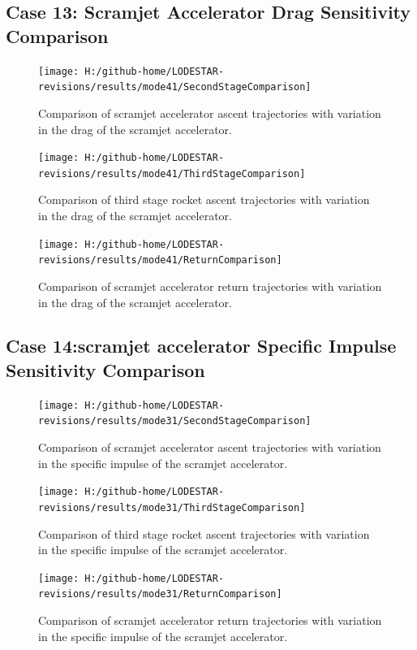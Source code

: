 \subsection{Case 13: Scramjet Accelerator Drag Sensitivity Comparison}\label{sec:app_comparison41}
\begin{figure}[!th]
\centering
\texttt{[image: H:/github-home/LODESTAR-revisions/results/mode41/SecondStageComparison]}
\caption{Comparison of scramjet accelerator ascent trajectories with variation in the drag of the scramjet accelerator.}
\label{fig:SecondStageComparison11}
\end{figure}
\begin{figure}[!th]
\centering
\texttt{[image: H:/github-home/LODESTAR-revisions/results/mode41/ThirdStageComparison]}
\caption{Comparison of third stage rocket ascent trajectories with variation in the drag of the scramjet accelerator.}
\label{fig:ThirdStageComparison11}
\end{figure}
\begin{figure}[!th]
\centering
\texttt{[image: H:/github-home/LODESTAR-revisions/results/mode41/ReturnComparison]}
\caption{Comparison of scramjet accelerator return trajectories with variation in the drag of the scramjet accelerator.}
\label{fig:ReturnComparison11}
\end{figure}
\FloatBarrier
\clearpage
\subsection{Case 14:scramjet accelerator Specific Impulse Sensitivity Comparison}\label{sec:app_comparison31}
\begin{figure}[!th]
	\centering
	\texttt{[image: H:/github-home/LODESTAR-revisions/results/mode31/SecondStageComparison]}
	\caption{Comparison of scramjet accelerator ascent trajectories with variation in the specific impulse of the scramjet accelerator.}
	\label{fig:SecondStageComparison10}
\end{figure}
\begin{figure}[!th]
	\centering
	\texttt{[image: H:/github-home/LODESTAR-revisions/results/mode31/ThirdStageComparison]}
	\caption{Comparison of third stage rocket ascent trajectories with variation in the specific impulse of the scramjet accelerator.}
	\label{fig:ThirdStageComparison10}
\end{figure}
\begin{figure}[!th]
	\centering
	\texttt{[image: H:/github-home/LODESTAR-revisions/results/mode31/ReturnComparison]}
	\caption{Comparison of scramjet accelerator return trajectories with variation in the specific impulse of the scramjet accelerator.}
	\label{fig:ReturnComparison10}
\end{figure}
\FloatBarrier
\clearpage
